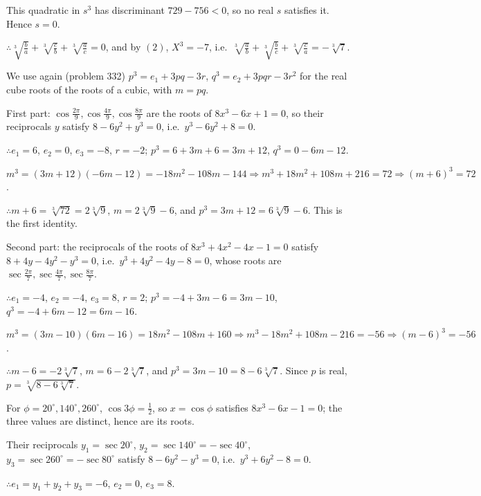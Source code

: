   This quadratic in $s^3$ has discriminant $729 - 756 < 0$, so no real $s$ satisfies it. Hence $s = 0$.

  $\therefore \sqrt[3]{\frac{b}{a}} + \sqrt[3]{\frac{c}{b}} + \sqrt[3]{\frac{a}{c}} = 0$, and by $(2)$, $X^3 = -7$,
  i.e.\ $\sqrt[3]{\frac{a}{b}} + \sqrt[3]{\frac{b}{c}} + \sqrt[3]{\frac{c}{a}} = -\sqrt[3]{7}$.
\item We use again (problem 332) $p^3 = e_1 + 3pq - 3r$, $q^3 = e_2 + 3pqr - 3r^2$ for the real cube roots of the
  roots of a cubic, with $m = pq$.

  First part: $\cos\frac{2\pi}{9}, \cos\frac{4\pi}{9}, \cos\frac{8\pi}{9}$ are the roots of $8x^3 - 6x + 1 = 0$, so
  their reciprocals $y$ satisfy $8 - 6y^2 + y^3 = 0$, i.e.\ $y^3 - 6y^2 + 8 = 0$.

  $\therefore e_1 = 6$, $e_2 = 0$, $e_3 = -8$, $r = -2$; $p^3 = 6 + 3m + 6 = 3m + 12$, $q^3 = 0 - 6m - 12$.

  $m^3 = (3m + 12)(-6m - 12) = -18m^2 - 108m - 144\Rightarrow m^3 + 18m^2 + 108m + 216 = 72\Rightarrow (m + 6)^3 =
  72$.

  $\therefore m + 6 = \sqrt[3]{72} = 2\sqrt[3]{9}$, $m = 2\sqrt[3]{9} - 6$, and $p^3 = 3m + 12 = 6\sqrt[3]{9} - 6$.
  This is the first identity.

  Second part: the reciprocals of the roots of $8x^3 + 4x^2 - 4x - 1 = 0$ satisfy $8 + 4y - 4y^2 - y^3 = 0$, i.e.\
  $y^3 + 4y^2 - 4y - 8 = 0$, whose roots are $\sec\frac{2\pi}{7}, \sec\frac{4\pi}{7}, \sec\frac{8\pi}{7}$.

  $\therefore e_1 = -4$, $e_2 = -4$, $e_3 = 8$, $r = 2$; $p^3 = -4 + 3m - 6 = 3m - 10$, $q^3 = -4 + 6m - 12 = 6m -
  16$.

  $m^3 = (3m - 10)(6m - 16) = 18m^2 - 108m + 160\Rightarrow m^3 - 18m^2 + 108m - 216 = -56\Rightarrow (m - 6)^3 =
  -56$.

  $\therefore m - 6 = -2\sqrt[3]{7}$, $m = 6 - 2\sqrt[3]{7}$, and $p^3 = 3m - 10 = 8 - 6\sqrt[3]{7}$. Since $p$ is
  real, $p = \sqrt[3]{8 - 6\sqrt[3]{7}}$.
\item For $\phi = 20^\circ, 140^\circ, 260^\circ$, $\cos3\phi = \frac{1}{2}$, so $x = \cos\phi$ satisfies $8x^3 - 6x
  - 1 = 0$; the three values are distinct, hence are its roots.

  Their reciprocals $y_1 = \sec20^\circ$, $y_2 = \sec140^\circ = -\sec40^\circ$, $y_3 = \sec260^\circ =
  -\sec80^\circ$ satisfy $8 - 6y^2 - y^3 = 0$, i.e.\ $y^3 + 6y^2 - 8 = 0$.

  $\therefore e_1 = y_1 + y_2 + y_3 = -6$, $e_2 = 0$, $e_3 = 8$.

